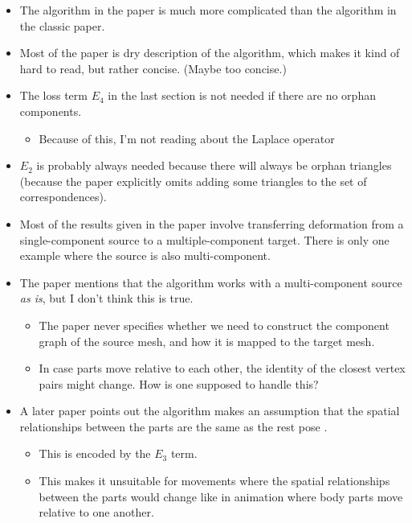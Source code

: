 \documentclass[10pt]{article}
\begin{document}
\begin{itemize}
    \item The algorithm in the paper is much more complicated than the algorithm in the classic paper.
    
    \item Most of the paper is dry description of the algorithm, which makes it kind of hard to read, but rather concise. (Maybe too concise.)
    
    \item The loss term $E_4$ in the last section is not needed if there are no orphan components.
    \begin{itemize}
        \item Because of this, I'm not reading about the Laplace operator 
    \end{itemize}
    
    \item $E_2$ is probably always needed because there will always be orphan triangles (because the paper explicitly omits adding some triangles to the set of correspondences).
    
    \item Most of the results given in the paper involve transferring deformation from a single-component source to a multiple-component target. There is only one example where the source is also multi-component.
    
    \item The paper mentions that the algorithm works with a multi-component source \emph{as is}, but I don't think this is true.
    \begin{itemize}
        \item The paper never specifies whether we need to construct the component graph of the source mesh, and how it is mapped to the target mesh.
        
        \item In case parts move relative to each other, the identity of the closest vertex pairs might change. How is one supposed to handle this?
    \end{itemize}

    \item A later paper points out the algorithm makes an assumption that the spatial relationships between the parts are the same as the rest pose \cite{Ho:2010:SRPMA}.
    \begin{itemize}
        \item This is encoded by the $E_3$ term.

        \item This makes it unsuitable for movements where the spatial relationships between the parts would change like in animation where body parts move relative to one another.        
    \end{itemize}
\end{itemize}


  
\end{document}
